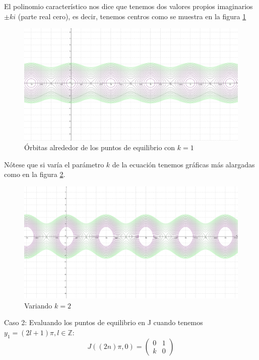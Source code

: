 \documentclass[10pt,letterpaper,titlepage]{article}
\begin{document}
El polinomio caracter\'istico nos dice que tenemos dos valores propios imaginarios $\pm ki$ (parte real cero), es decir, tenemos centros como se muestra en la figura \ref{fig:orbitas}

\begin{figure}
	\includegraphics[width=\textwidth]{plot.png}
	\caption{Órbitas alrededor de los puntos de equilibrio con $k=1$}
	\label{fig:orbitas}
\end{figure}

Nótese que si varía el parámetro $k$ de la ecuación tenemos gráficas más alargadas como en la figura \ref{fig:orbitas_largas}.

\begin{figure}
	\includegraphics[width=\textwidth]{plot2.png}
	\caption{Variando $k=2$}
	\label{fig:orbitas_largas}
\end{figure}

Caso 2: Evaluando los puntos de equilibrio en J cuando tenemos $y_{1}= (2l+1)\pi, l \in \mathbb{Z}$:
\[
	J((2n) \pi,0) = \begin{pmatrix}
		0 & 1\\
		k & 0
	\end{pmatrix}
\]
\end{document}
